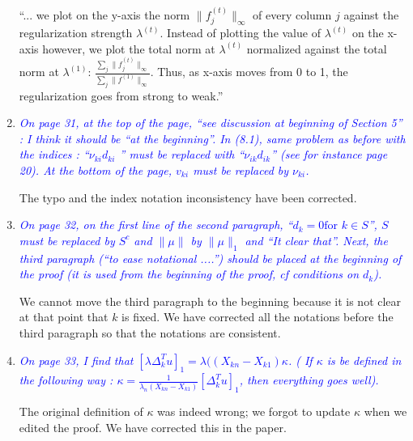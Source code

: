 \documentclass[pdftex,12pt]{article}
\def\rc#1{{\it\textcolor{blue}{#1}}\smallskip}
\begin{document}
\begin{enumerate}
``... we plot on the y-axis the norm $\|f^{(t)}_j\|_{\infty}$ of every column $j$ against the regularization strength $\lambda^{(t)}$. Instead of plotting the value of $\lambda^{(t)}$ on the x-axis however, we plot the total norm at $\lambda^{(t)}$ normalized against the total norm at $\lambda^{(1)}$: $\frac{\sum_j \|f^{(t)}_j\|_{\infty}}{\sum_j \|f^{(1)}\|_{\infty}}$. Thus, as x-axis moves from 0 to 1, the regularization goes from strong to weak.''

\item \rc{On page 31, at the top of the page, ``see discussion at beginning of
Section 5'' : I think it should be ``at the beginning''. In (8.1),
same problem as before with the indices : ``$\nu_{ki} d_{ki}$ '' must be replaced
with ``$\nu_{ik}d_{ik}$'' (see for instance page 20). At the bottom of the page,
$v_{ki}$ must be replaced by $\nu_{ki}$.} 

The typo and the index notation inconsistency have been corrected.

\item \rc{On page 32, on the first line of the second paragraph, ``$d_k = 0 \mbox{for $k
\in S$}$'', $S$ must be replaced by $S^c$ and $\|\mu\|$ by $\|\mu\|_1$ and ``It clear
that''. Next, the third paragraph (``to ease notational ....'') should
be placed at the beginning of the proof (it is used from the beginning
of the proof, cf conditions on $d_k$).}

We cannot move the third paragraph to the beginning because it is not clear at that point that $k$ is fixed. We have corrected all the notations before the third paragraph so that the notations are consistent.

\item \rc{On page 33, I find that $[\lambda\Delta_k^Tu]_1 = \lambda((X_{kn} −X_{k1})\kappa$. ( If $\kappa$ is be defined
in the following way : $\kappa = \frac{1}{\lambda_n(X_{kn}-X_{k1})}[\Delta_k^T u]_1$, then everything
goes well).}

The original definition of $\kappa$ was indeed wrong; we forgot to update $\kappa$ when we edited the proof. We have corrected this in the paper.




\end{enumerate}
\end{document}
